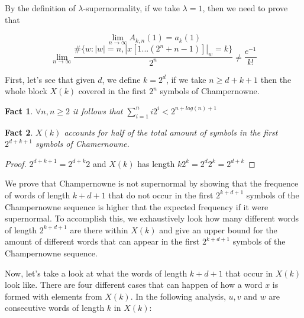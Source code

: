 \documentclass[11pt,a4paper,twoside]{tesis}
\newtheorem{fact}{Fact}[section]
\theoremstyle{definition}
\begin{document}
By the definition of $\lambda$-supernormality, if we take $\lambda = 1$, then we need to prove that

$$\lim_{n\to\infty} A_{k,n}(1) = a_k(1)$$
$$\lim_{n\to\infty} \frac{\#\{w: |w| = n  , |x[1...(2^n+n-1)]|_w = k\}}{2^n} \neq \frac{e^{-1}}{k!}$$

\bigskip

First, let's see that given $d$, we define $k = 2^d$, if we take $n \geq d + k + 1$ then the whole block $X(k)$ covered in the first $2^n$ symbols of Champernowne.


\begin{fact}
    $\forall n, n  \geq 2$ it follows that $\sum_{i=1}^n i2^i < 2^{n + log(n) + 1}$ 
\end{fact}

\begin{fact} \label{p2}
    $X(k)$ accounts for half of the total amount of symbols in the first $2^{d+k+1}$ symbols of Chamernowne.
\end{fact}
\begin{proof}
    $2^{d+k+1} = 2^{d+k}2$ and $X(k)$ has length $k2^k = 2^d2^k = 2^{d+k}$ 
\end{proof}

We prove that Champernowne is not supernormal by showing that the frequence of words of length $k+d+1$ that do not occur in the first $2^{k+d+1}$ symbols of the Champernowne sequence is higher that the expected frequency if it were supernormal.
To accomplish this, we exhaustively look how many different words of length $2^{k+d+1}$ are there within $X(k)$ and give an upper bound for the amount of different words that can appear in the first $2^{k+d+1}$ symbols of the Champernowne sequence.

Now, let's take a look at what the words of length $k + d + 1$ that occur in $X(k)$ look like. There are four different cases that can happen of how a word $x$ is formed with elements from $X(k)$. 
In the following analysis, $u, v$ and $w$ are consecutive words of length $k$ in $X(k)$:
\end{document}
